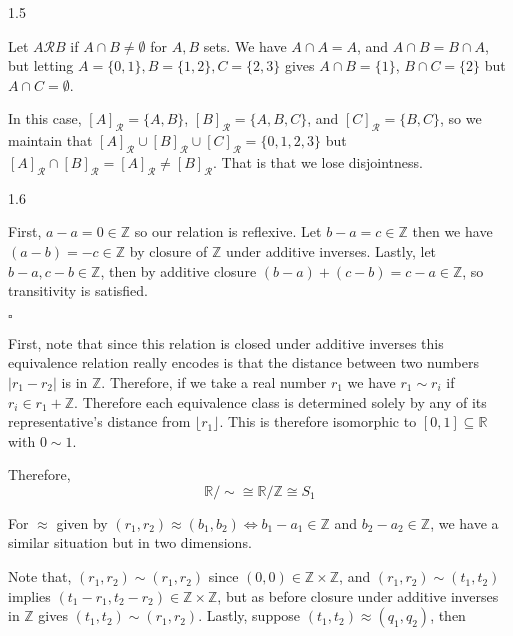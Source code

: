 \documentclass[letterpaper,12pt]{article}
\theoremstyle{definition}
\begin{document}
\begin{flushleft}
	1.5
\end{flushleft}

Let $A \mathcal{R} B$ if $A \cap B \neq \emptyset$ for $A, B$ sets. We have $A \cap A = A$, and $A \cap B = B \cap A$, but letting $A = \{0, 1\}, B = \{1, 2\}, C = \{2, 3\}$ gives $A \cap B = \{1\}$, $B \cap C = \{2\}$ but $A \cap C = \emptyset$. 

In this case, $[A]_\mathcal{R} = \{A, B\}$, $[B]_\mathcal{R} = \{A, B, C\}$, and $[C]_\mathcal{R} = \{B, C\}$, so we maintain that $[A]_\mathcal{R} \cup [B]_\mathcal{R} \cup [C]_\mathcal{R} = \{0, 1, 2, 3\}$ but $[A]_\mathcal{R} \cap [B]_\mathcal{R} = [A]_\mathcal{R} \neq [B]_\mathcal{R}$. That is that we lose disjointness.

\begin{flushleft}
	1.6
\end{flushleft}

First, $a - a = 0 \in \mathbb{Z}$ so our relation is reflexive. Let $b - a = c \in \mathbb{Z}$ then we have $(a - b) = -c \in \mathbb{Z}$ by closure of $\mathbb{Z}$ under additive inverses. Lastly, let $b - a, c - b \in \mathbb{Z}$, then by additive closure $(b - a) + (c - b) = c - a \in \mathbb{Z}$, so transitivity is satisfied. 

\begin{flushright}
	$\square$
\end{flushright}

First, note that since this relation is closed under additive inverses this equivalence relation really encodes is that the distance between two numbers $|r_1 - r_2|$ is in $\mathbb{Z}$. Therefore, if we take a real number $r_1$ we have $r_1 \sim r_i$ if $r_i \in r_1 + \mathbb{Z}$. Therefore each equivalence class is determined solely by any of its representative's distance from $\lfloor r_1 \rfloor$. This is therefore isomorphic to $[0, 1] \subseteq \mathbb{R}$ with $0 \sim 1$.

Therefore, $$\mathbb{R} /\sim \cong \mathbb{R} / \mathbb{Z} \cong S_1$$

\hrulefill

For $\approx$ given by $(r_1, r_2) \approx (b_1, b_2) \Leftrightarrow b_1 - a_1 \in \mathbb{Z}$ and $b_2 - a_2 \in \mathbb{Z}$, we have a similar situation but in two dimensions. 

Note that, $(r_1, r_2) \sim (r_1, r_2)$ since $(0, 0) \in \mathbb{Z} \times \mathbb{Z}$, and $(r_1, r_2) \sim (t_1, t_2)$ implies $(t_1 - r_1, t_2 - r_2) \in \mathbb{Z} \times \mathbb{Z}$, but as before closure under additive inverses in $\mathbb{Z}$ gives $(t_1, t_2) \sim (r_1, r_2)$. Lastly, suppose $(t_1, t_2) \approx (q_1, q_2)$, then 
\end{document}
